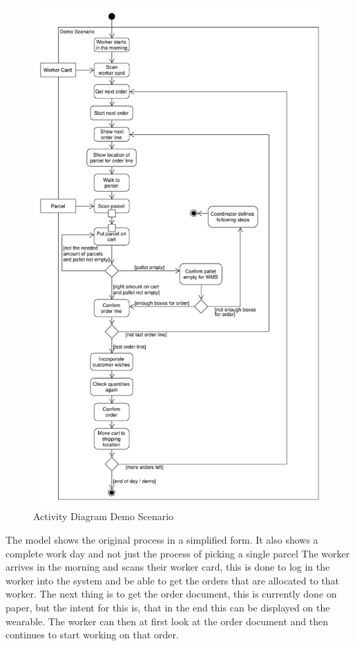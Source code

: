 \begin{figure}[htbp]
	\begin{center}
	\includegraphics[height=\textheight]{images/activityDiagram_demoScenarioNoExceptions}
	\end{center}
	\caption{Activity Diagram Demo Scenario}
	\label{fig:activityDemoScenario}
\end{figure}

\clearpage

The model shows the original process in a simplified form. It also shows a complete work day and not just the process of picking a single parcel  The worker arrives in the morning and scans their worker card, this is done to log in the worker into the system and be able to get the orders that are allocated to that worker. The next thing is to get the order document, this is currently done on paper, but the intent for this is, that in the end this can be displayed on the wearable. The worker can then at first look at the order document and then continues to start working on that order. 

